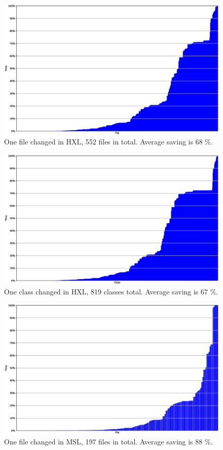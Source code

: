 \documentclass{cslthse-msc}
\begin{document}
\begin{figure}[!htbp]
    \centering
    \includegraphics[width=\textwidth]{Graphs/HXL_one_file.eps}
    \caption{One file changed in HXL, 552 files in total. Average saving is 68 \%.}
    \label{fig:hxlonefile}
\end{figure}

\begin{figure}[!htbp]
    \centering
    \includegraphics[width=\textwidth]{Graphs/HXL_one_model.eps}
    \caption{One class changed in HXL, 819 classes total. Average saving is 67 \%.}
    \label{fig:hxlonemodel}
\end{figure}

\begin{figure}[!htbp]
    \centering
    \includegraphics[width=\textwidth]{Graphs/MSL_one_file.eps}
    \caption{One file changed in MSL, 197 files in total. Average saving is 88 \%.}
    \label{fig:mslonefile}
\end{figure}
\end{document}
